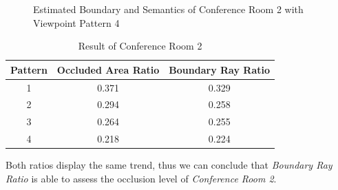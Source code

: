 \documentclass[11pt, a4paper,oneside,chapterprefix=false]{scrbook}
\begin{document}
\vspace{90pt}

\begin{figure}[H]
    \centering
      \label{fig:conf2 b 200 6} \hfill
     \label{fig:conf2 s 200 6}
    \caption{Estimated Boundary and Semantics of Conference Room 2 with Viewpoint Pattern 4}
    \label{fig:conf2 6}
\end{figure}

\vspace{90pt}

\begin{table}[H]
    \centering
    \begin{tabular}{|c|c|c|}
        \hline
        \textbf{Pattern} & \textbf{Occluded Area Ratio} & \textbf{Boundary Ray Ratio} \\
        \hline
        1 & 0.371 & 0.329 \\
        2 & 0.294 & 0.258 \\
		3 & 0.264 & 0.255 \\
		4 & 0.218 & 0.224 \\
        \hline
    \end{tabular}
    \caption{Result of Conference Room 2}
    \label{tab:result of conference room 2}
\end{table}

Both ratios display the same trend, thus we can conclude that \textit{Boundary Ray Ratio} is able to assess the occlusion level of \textit{Conference Room 2}.
\end{document}
